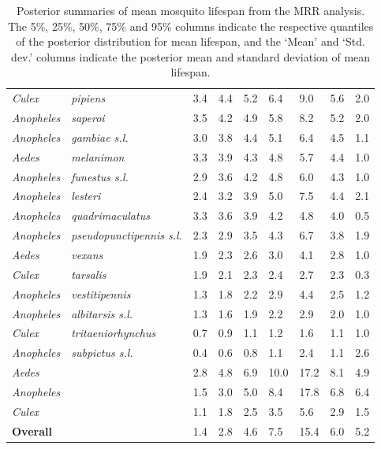 \documentclass[12pt]{article}
\begin{document}
{\begin{table}[htbp]
\begin{tabular}{l|l|l|l|l|l|l|l|l}
\textit{Culex} & \textit{pipiens} & 3.4 & 4.4 & 5.2 & 6.4 & 9.0 & 5.6 & 2.0 \\
\textit{Anopheles} & \textit{saperoi} & 3.5 & 4.2 & 4.9 & 5.8 & 8.2 & 5.2 & 2.0 \\
\textit{Anopheles} & \textit{gambiae s.l.} & 3.0 & 3.8 & 4.4 & 5.1 & 6.4 & 4.5 & 1.1 \\
\textit{Aedes} & \textit{melanimon} & 3.3 & 3.9 & 4.3 & 4.8 & 5.7 & 4.4 & 1.0 \\
\textit{Anopheles} & \textit{funestus s.l.} & 2.9 & 3.6 & 4.2 & 4.8 & 6.0 & 4.3 & 1.0 \\
\textit{Anopheles} & \textit{lesteri} & 2.4 & 3.2 & 3.9 & 5.0 & 7.5 & 4.4 & 2.1 \\
\textit{Anopheles} & \textit{quadrimaculatus} & 3.3 & 3.6 & 3.9 & 4.2 & 4.8 & 4.0 & 0.5 \\
\textit{Anopheles} & \textit{pseudopunctipennis s.l.} & 2.3 & 2.9 & 3.5 & 4.3 & 6.7 & 3.8 & 1.9 \\
\textit{Aedes} & \textit{vexans} & 1.9 & 2.3 & 2.6 & 3.0 & 4.1 & 2.8 & 1.0 \\
\textit{Culex} & \textit{tarsalis} & 1.9 & 2.1 & 2.3 & 2.4 & 2.7 & 2.3 & 0.3 \\
\textit{Anopheles} & \textit{vestitipennis} & 1.3 & 1.8 & 2.2 & 2.9 & 4.4 & 2.5 & 1.2 \\
\textit{Anopheles} & \textit{albitarsis s.l.} & 1.3 & 1.6 & 1.9 & 2.2 & 2.9 & 2.0 & 1.0 \\
\textit{Culex} & \textit{tritaeniorhynchus} & 0.7 & 0.9 & 1.1 & 1.2 & 1.6 & 1.1 & 1.0 \\
\textit{Anopheles} & \textit{subpictus s.l.} & 0.4 & 0.6 & 0.8 & 1.1 & 2.4 & 1.1 & 2.6 \\
\hline
\textit{Aedes} & \text{} & 2.8 & 4.8 & 6.9 & 10.0 & 17.2 & 8.1 & 4.9 \\
\textit{Anopheles} & \text{} & 1.5 & 3.0 & 5.0 & 8.4 & 17.8 & 6.8 & 6.4 \\
\textit{Culex} & \text{} & 1.1 & 1.8 & 2.5 & 3.5 & 5.6 & 2.9 & 1.5 \\
\hline
\textbf{Overall} & \text{} & 1.4 & 2.8 & 4.6 & 7.5 & 15.4 & 6.0 & 5.2 \\
\end{tabular}
\caption{Posterior summaries of mean mosquito lifespan from the MRR analysis. The 5\%, 25\%, 50\%, 75\% and 95\% columns indicate the respective quantiles of the posterior distribution for mean lifespan, and the `Mean' and `Std. dev.' columns indicate the posterior mean and standard deviation of mean lifespan.}
\label{tab:mrr_estimated_lifespans}%
\end{table}%


}
\end{document}
